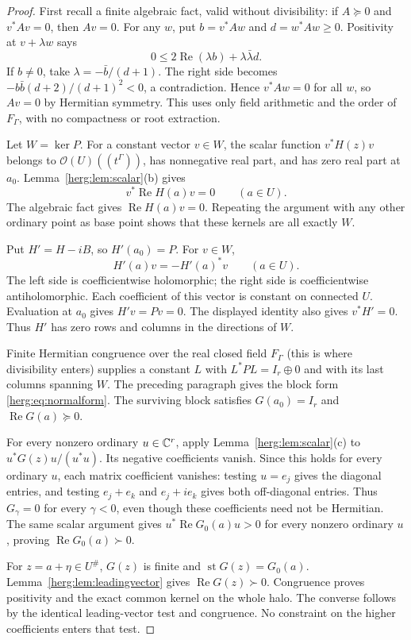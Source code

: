 \documentclass[11pt,letterpaper]{article}
\theoremstyle{definition}
\newcommand{\FG}{F_\Gamma}\newcommand{\KG}{K_\Gamma}
\newcommand{\OU}[1]{\mathcal O(#1)((t^\Gamma))}
\newcommand{\st}{\operatorname{st}}
\newcommand{\Rea}{\operatorname{Re}}
\newcommand{\halo}[1]{#1^{\#}}
\numberwithin{equation}{section}
\begin{document}
\begin{proof}
First recall a finite algebraic fact, valid without divisibility: if
$A\succeq0$ and $v^*Av=0$, then $Av=0$. For any $w$, put
$b=v^*Aw$ and $d=w^*Aw\ge0$. Positivity at $v+\lambda w$ says
\[
 0\le 2\Rea(\lambda b)+\lambda\bar\lambda d.
\]
If $b\ne0$, take $\lambda=-\bar b/(d+1)$. The right side becomes
$-b\bar b(d+2)/(d+1)^2<0$, a contradiction. Hence $v^*Aw=0$ for all
$w$, so $Av=0$ by Hermitian symmetry. This uses only field arithmetic and
the order of $\FG$, with no compactness or root extraction.

Let $W=\ker P$. For a constant vector $v\in W$, the scalar function $v^*H(z)v$ belongs to $\OU{U}$, has nonnegative real part, and has zero real part at $a_0$. Lemma~\ref{herg:lem:scalar}(b) gives
\[
 v^*\Rea H(a)v=0\qquad(a\in U).
\]
The algebraic fact gives $\Rea H(a)v=0$. Repeating the argument with any other ordinary point as base point shows that these kernels are all exactly $W$.

Put $H'=H-iB$, so $H'(a_0)=P$. For $v\in W$,
\[
 H'(a)v=-H'(a)^*v\qquad(a\in U).
\]
The left side is coefficientwise holomorphic; the right side is coefficientwise antiholomorphic. Each coefficient of this vector is constant on connected $U$. Evaluation at $a_0$ gives $H'v=Pv=0$. The displayed identity also gives $v^*H'=0$. Thus $H'$ has zero rows and columns in the directions of $W$.

Finite Hermitian congruence over the real closed field $\FG$ (this is where divisibility enters) supplies a constant $L$ with $L^*PL=I_r\oplus0$ and with its last columns spanning $W$. The preceding paragraph gives the block form \eqref{herg:eq:normalform}. The surviving block satisfies $G(a_0)=I_r$ and $\Rea G(a)\succeq0$.

For every nonzero ordinary $u\in\mathbb C^r$, apply Lemma~\ref{herg:lem:scalar}(c) to $u^*G(z)u/(u^*u)$. Its negative coefficients vanish. Since this holds for every ordinary $u$, each matrix coefficient vanishes:
testing $u=e_j$ gives the diagonal entries, and testing $e_j+e_k$ and
$e_j+i e_k$ gives both off-diagonal entries. Thus $G_\gamma=0$ for
every $\gamma<0$, even though these coefficients need not be Hermitian. The same scalar argument gives $u^*\Rea G_0(a)u>0$ for every nonzero ordinary $u$, proving $\Rea G_0(a)\succ0$.

For $z=a+\eta\in\halo U$, $G(z)$ is finite and $\st G(z)=G_0(a)$. Lemma~\ref{herg:lem:leadingvector} gives $\Rea G(z)\succ0$. Congruence proves positivity and the exact common kernel on the whole halo. The converse follows by the identical leading-vector test and congruence. No constraint on the higher coefficients enters that test.
\end{proof}
\end{document}
